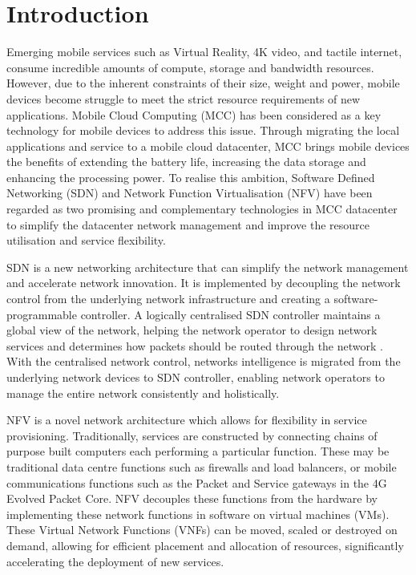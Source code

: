
\section{Introduction}
\label{sec:introduction}

Emerging mobile services such as Virtual Reality, 4K video, and tactile internet, consume incredible amounts of compute, storage and bandwidth resources\cite{AndrewsBCHLSZ14}. However, due to the inherent constraints of their size, weight and power, mobile devices become struggle to meet the strict resource requirements of new applications. Mobile Cloud Computing (MCC) \cite{7809047} \cite{7364240} has been considered as a key technology for mobile devices to address this issue. Through migrating the local applications and service to a mobile cloud datacenter, MCC brings mobile devices the benefits of extending the battery life, increasing the data storage and enhancing the processing power. To realise this ambition, Software Defined Networking (SDN) and Network Function Virtualisation (NFV) have been regarded as two promising and complementary technologies in MCC datacenter to simplify the datacenter network management and improve the resource utilisation and service flexibility. 

SDN is a new networking architecture that can simplify the network management and accelerate network innovation. It is implemented by decoupling the network control from the underlying network infrastructure and creating a software-programmable controller. A logically centralised SDN controller maintains a global view of the network, helping the network operator to design network services and determines how packets should be routed through the network \cite{KimF13} \cite{HaresW13}. With the centralised network control, networks intelligence is migrated from the underlying network devices to SDN controller, enabling network operators to manage the entire network consistently and holistically. 

NFV is a novel network architecture which allows for flexibility in service provisioning. Traditionally, services are constructed by connecting chains of purpose built computers each performing a particular function. These may be traditional data centre functions such as firewalls and load balancers, or mobile communications functions such as the Packet and Service gateways in the 4G Evolved Packet Core. NFV decouples these functions from the hardware by implementing these network functions in software on virtual machines (VMs). These Virtual Network Functions (VNFs) can be moved, scaled or destroyed on demand, allowing for efficient placement and allocation of resources, significantly accelerating the deployment of new services. 

